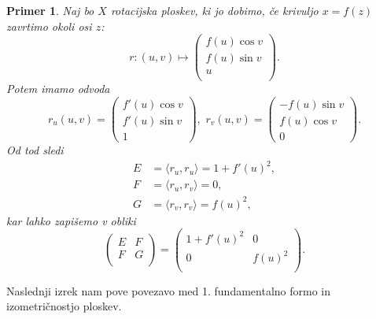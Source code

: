 \documentclass[10pt, a4paper]{article}
\newtheorem{primer}[izr]{Primer}
\begin{document}
\begin{primer}
 Naj bo $X$ rotacijska ploskev, ki jo dobimo, če krivuljo $x =  f(z)$
 zavrtimo okoli osi $z$: 
 \[ r: \left( u,v \right) \mapsto  
\begin{pmatrix}
	f(u) \cos v \\
	f(u) \sin v \\
	u \\
\end{pmatrix}
.\]Potem imamo odvoda 
\[   r_u(u,v) = \begin{pmatrix} f'(u) \cos v \\ f'(u) \sin v \\ 1
\end{pmatrix}, \,\,  r_v(u,v) = 
\begin{pmatrix}-f(u) \sin  v \\ f(u) \cos v \\ 0
\end{pmatrix}.\]
Od tod sledi 
\[ \begin{align*}
    E &= \langle r_u, r_u \rangle = 1 + f'(u)^2, \\
    F &= \langle r_u, r_v \rangle = 0, \\
	G &= \langle r_v, r_v \rangle = f(u)^2,
\end{align*} \] kar lahko zapišemo v obliki 
\[ 
\begin{pmatrix}
	E & F \\
	F & G \\
\end{pmatrix}
=
\begin{pmatrix}
	1 + f'(u)^2 & 0 \\
	0 & f(u)^2 \\
\end{pmatrix}
.
\]
\end{primer}

Naslednji izrek nam pove povezavo med 1. fundamentalno formo in
izometričnostjo ploskev.
\end{document}
